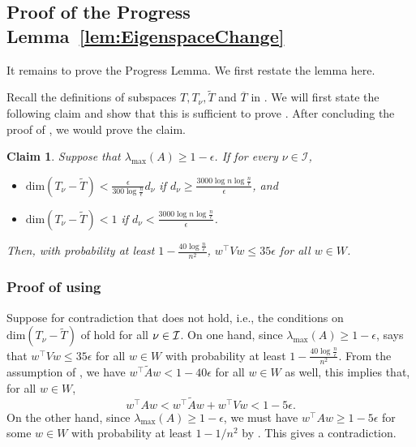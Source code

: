 \documentclass[11pt]{article}
\newtheorem{claim}[theorem]{Claim}
\def\dim#1{\mathrm{dim} (#1)}
\newcommand\ww{\boldsymbol{\mathit{w}}}
\renewcommand\AA{\boldsymbol{\mathit{A}}}
\newcommand\WW{\boldsymbol{\mathit{W}}}
\newcommand\VV{\boldsymbol{\mathit{V}}}
\newcommand\Ttil{{\tilde{\mathit{T}}}}
\newcommand\AAtil{\boldsymbol{\widetilde{\mathit{A}}}}
\begin{document}
\subsection{Proof of the Progress Lemma~\ref{lem:EigenspaceChange}}\label{sec:progress}
It remains to prove the Progress Lemma. We first restate the lemma here.

\progress*
Recall the definitions of subspaces $T,T_\nu,\Ttil$ and $\overline{T}$ in .
We will first state the following claim and show that this is sufficient to prove . After concluding the proof of , we would prove the claim.

\begin{claim}\label{cl:progress} Suppose that $\lambda_{\max}(\AA) \geq 1-\epsilon$. If for every $\nu \in \mathcal{I}$, 
\begin{itemize}
\item $\dim{T_{\nu} -\tilde{T}} < \frac{\epsilon}{300\log\frac{n}{\epsilon}} d_{\nu}$ if $d_{\nu} \geq \frac{3000\log n\log\frac{n}{\epsilon}}{\epsilon}$, and 
\item $\dim{T_{\nu} -\tilde{T}} < 1$ if $d_{\nu} < \frac{3000\log n\log\frac{n}{\epsilon}}{\epsilon}$.
\end{itemize}
Then, with probability at least $1-\frac{40\log\frac{n}{\epsilon}}{n^2}$, $\ww^{\top}\VV\ww\leq 35 \epsilon$ for all $\ww\in \WW$.
\end{claim}
\subsubsection*{Proof of  using }
Suppose for contradiction that  does not hold, i.e., the conditions on $\dim{T_\nu-\Ttil}$ of  hold for all $\nu \in \cal{I}$.
 On one hand, since $\lambda_{\max}(\AA)\geq 1-\epsilon$,  says that $\ww^{\top}\VV\ww\leq 35 \epsilon$ for all $\ww \in \WW$ with probability at least $1-\frac{40\log\frac{n}{\epsilon}}{n^2}$.
 From the assumption of , we have $\ww^{\top}\AAtil\ww < 1- 40\epsilon$ for all $\ww\in \WW$ as well, this implies that, for all $\ww \in \WW$,
\[
\ww^{\top}\AA\ww < \ww^{\top}\AAtil\ww +\ww^{\top}\VV\ww < 1-5\epsilon.
\]
On the other hand, since $\lambda_{\max}(\AA)\geq 1- \epsilon$, we must have  $\ww^{\top}\AA\ww \geq 1-5\epsilon$ for some $\ww\in \WW$ with probability at least $1-1/n^2$ by  .
This gives a contradiction. 
\end{document}
